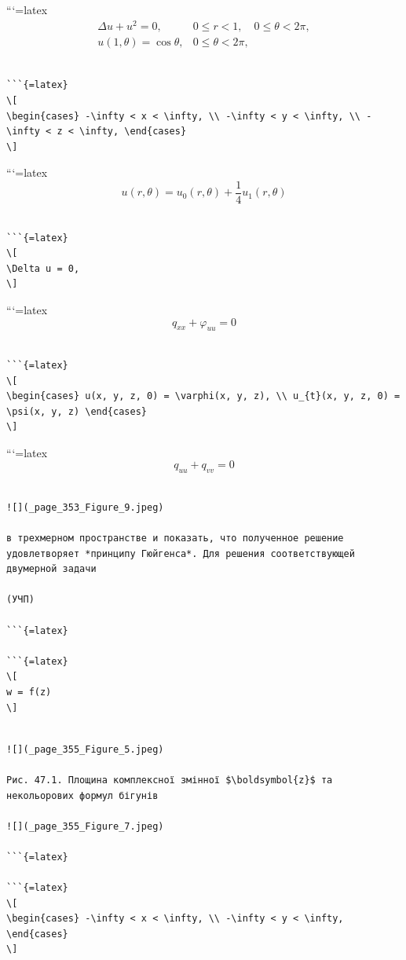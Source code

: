 \documentclass[
]{article}
\begin{document}
```{=latex}
\[
\begin{aligned} \Delta u + u^2 = 0, & 0 \leqslant r < 1, \quad 0 \leqslant \theta < 2\pi, \\ u(1, \theta) = \cos \theta, & 0 \leqslant \theta < 2\pi, \end{aligned}
\]

\begin{verbatim}

```{=latex}
\[
\begin{cases} -\infty < x < \infty, \\ -\infty < y < \infty, \\ -\infty < z < \infty, \end{cases}
\]
\end{verbatim}

```{=latex}
\[
u(r, \theta) = u_0(r, \theta) + \frac{1}{4}u_1(r, \theta)
\]

\begin{verbatim}

```{=latex}
\[
\Delta u = 0,
\]
\end{verbatim}

```{=latex}
\[
q_{xx} + \varphi_{uu} = 0
\]

\begin{verbatim}

```{=latex}
\[
\begin{cases} u(x, y, z, 0) = \varphi(x, y, z), \\ u_{t}(x, y, z, 0) = \psi(x, y, z) \end{cases}
\]
\end{verbatim}

```{=latex}
\[
q_{uu} + q_{vv} = 0
\]

\begin{verbatim}

![](_page_353_Figure_9.jpeg)

в трехмерном пространстве и показать, что полученное решение удовлетворяет *принципу Гюйгенса*. Для решения соответствующей двумерной задачи

(УЧП)

```{=latex}

```{=latex}
\[
w = f(z)
\]
\end{verbatim}

\begin{verbatim}

![](_page_355_Figure_5.jpeg)

Рис. 47.1. Площина комплексної змінної $\boldsymbol{z}$ та некольорових формул бігунів

![](_page_355_Figure_7.jpeg)

```{=latex}

```{=latex}
\[
\begin{cases} -\infty < x < \infty, \\ -\infty < y < \infty, \end{cases}
\]
\end{verbatim}
\end{document}
